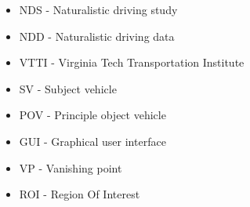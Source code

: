 \begin{itemize}
    \item NDS - Naturalistic driving study
    \item NDD - Naturalistic driving data
    \item VTTI - Virginia Tech Transportation Institute
    \item SV - Subject vehicle
    \item POV - Principle object vehicle
    \item GUI - Graphical user interface
    \item VP - Vanishing point
    \item ROI - Region Of Interest
\end{itemize}

